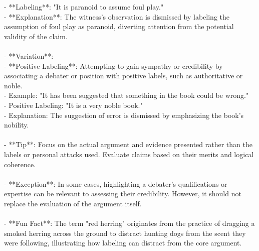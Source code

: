 \documentclass[a4paper,12pt,single,pdftex]{scrbook}
\begin{document}
    
        - **Labeling**: "It is paranoid to assume foul play."
    \\

    
        - **Explanation**: The witness's observation is dismissed by labeling the assumption of foul play as paranoid, diverting attention from the potential validity of the claim.
    \\

    
      
    \\

    
      - **Variation**:
    \\

    
        - **Positive Labeling**: Attempting to gain sympathy or credibility by associating a debater or position with positive labels, such as authoritative or noble.
    \\

    
          - Example: "It has been suggested that something in the book could be wrong."
    \\

    
          - Positive Labeling: "It is a very noble book."
    \\

    
          - Explanation: The suggestion of error is dismissed by emphasizing the book's nobility.
    \\

    
      
    \\

    
      - **Tip**: Focus on the actual argument and evidence presented rather than the labels or personal attacks used. Evaluate claims based on their merits and logical coherence.
    \\

    
      
    \\

    
      - **Exception**: In some cases, highlighting a debater's qualifications or expertise can be relevant to assessing their credibility. However, it should not replace the evaluation of the argument itself.
    \\

    
      
    \\

    
      - **Fun Fact**: The term "red herring" originates from the practice of dragging a smoked herring across the ground to distract hunting dogs from the scent they were following, illustrating how labeling can distract from the core argument.
    \\
\end{document}
